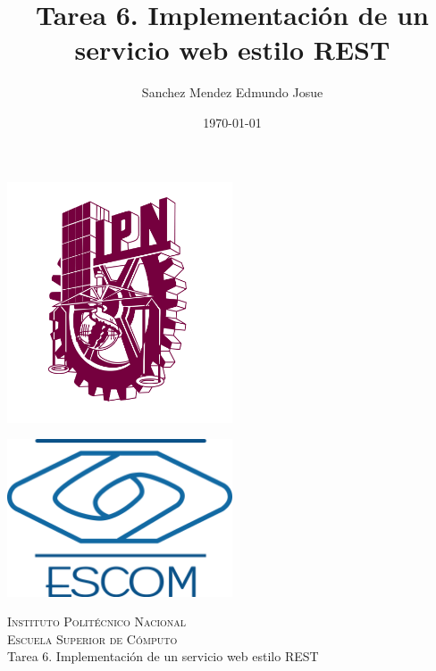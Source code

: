 \documentclass[11pt]{article}
\date{\today}
\title{Tarea 6. Implementación de un servicio web estilo REST}
\author{Sanchez Mendez Edmundo Josue}
\begin{document}
		\begin{titlepage}
			\begin{center}
				
				
				\noindent
				\begin{minipage}{0.5\textwidth}
					\begin{flushleft} \large
						\includegraphics[width=0.5\textwidth]{resources/ipn.png}
					\end{flushleft}
				\end{minipage}%
				\begin{minipage}{0.55\textwidth}
					\begin{flushright} \large
						\includegraphics[width=0.5\textwidth]{resources/escom.png}
					\end{flushright}
				\end{minipage}
				
				\textsc{\LARGE Instituto Politécnico Nacional}\\[0.5cm]
				
				\textsc{\Large Escuela Superior de Cómputo}\\[1cm]
				
				
				{ \huge Tarea 6. Implementación de un servicio web estilo REST \\[1cm] }
				

\end{center}
\end{titlepage}
\end{document}
